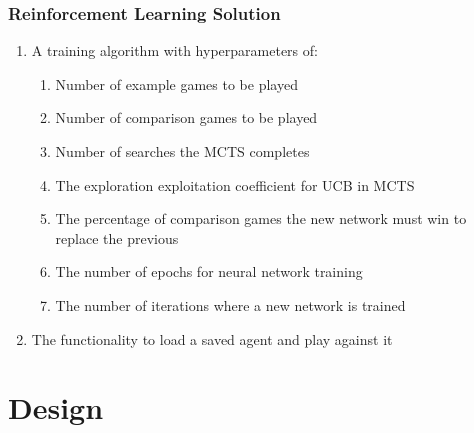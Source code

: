 \documentclass{article}
\begin{document}
    \subsubsection{Reinforcement Learning Solution} \label{RLS Objs}
    \begin{enumerate}
        \item A training algorithm with hyperparameters of:
        \begin{enumerate}
            \item Number of example games to be played
            \item Number of comparison games to be played
            \item Number of searches the MCTS completes
            \item The exploration exploitation coefficient for UCB in MCTS
            \item The percentage of comparison games the new network must win to replace the previous
            \item The number of epochs for neural network training
            \item The number of iterations where a new network is trained
        \end{enumerate}
        \item The functionality to load a saved agent and play against it
    \end{enumerate}

    \section{Design}
\end{document}
